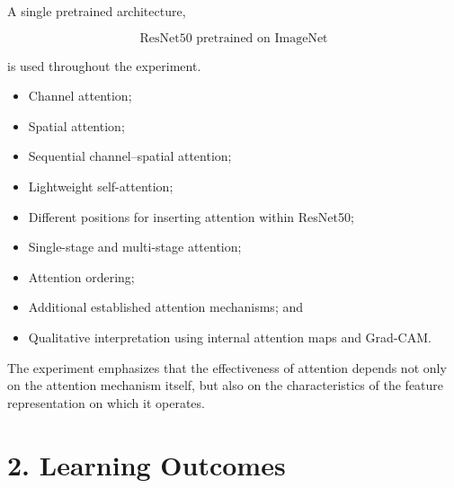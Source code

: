 \documentclass[10pt]{article}
\begin{document}
A single pretrained architecture,

\[
\boxed{\text{ResNet50 pretrained on ImageNet}}
\]

is used throughout the experiment.

\begin{itemize}

\item Channel attention;

\item Spatial attention;

\item Sequential channel--spatial attention;

\item Lightweight self-attention;

\item Different positions for inserting attention within ResNet50;

\item Single-stage and multi-stage attention;

\item Attention ordering;

\item Additional established attention mechanisms; and

\item Qualitative interpretation using internal attention maps and Grad-CAM.

\end{itemize}

The experiment emphasizes that the effectiveness of attention depends not
only on the attention mechanism itself, but also on the characteristics of
the feature representation on which it operates.

\section*{2. Learning Outcomes}
\end{document}
